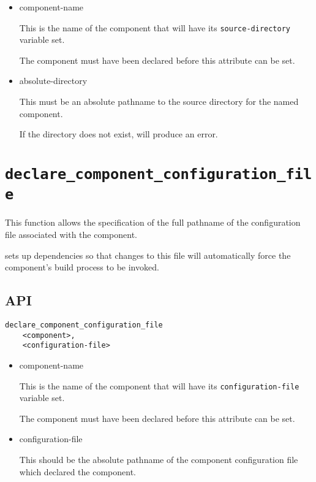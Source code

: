 \begin{itemize}
\item component-name

  This is the name of the component that will have its
  \texttt{source-directory} variable set.

  The component must have been declared before this attribute can be
  set.

\item absolute-directory

  This must be an absolute pathname to the source directory for the
  named component.

  If the directory does not exist, \lmsbw will produce an error.
\end{itemize}

\section{\texttt{declare\_component\_configuration\_file}}\label{api:configuration-file}

This function allows the specification of the full pathname of the
configuration file associated with the component.

\lmsbw sets up dependencies so that changes to this file will
automatically force the component's build process to be invoked.

\subsection{API}

\begin{verbatim}
declare_component_configuration_file
    <component>,
    <configuration-file>
\end{verbatim}

\begin{itemize}
\item component-name

  This is the name of the component that will have its
  \texttt{configuration-file} variable set.

  The component must have been declared before this attribute can be
  set.

\item configuration-file

  This should be the absolute pathname of the component configuration
  file which declared the component.

\end{itemize}



